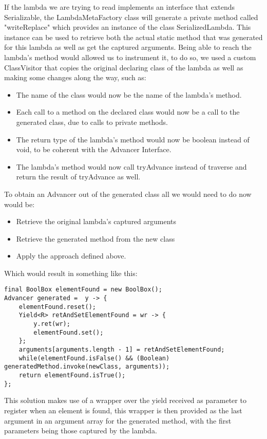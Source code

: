 If the lambda we are trying to read implements an interface that extends Serializable, the LambdaMetaFactory class will generate a private method called 
"writeReplace" which provides an instance of the class SerializedLambda. This instance can be used to retrieve both the actual static method that was generated for this lambda as well as get the captured arguments. Being able to reach the lambda's method would allowed us to instrument it, to do so, we used a custom ClassVisitor that copies the original declaring class of the lambda as well as making some changes along the way, such as:
\begin{itemize}
\item The name of the class would now be the name of the lambda's method.
\item Each call to a method on the declared class would now be a call to the generated class, due to calls to private methods.
\item The return type of the lambda's method would now be boolean instead of void, to be coherent with the Advancer Interface.
\item The lambda's method would now call tryAdvance instead of traverse and return the result of tryAdvance as well.
\end{itemize}

To obtain an Advancer out of the generated class all we would need to do now would be:
\begin{itemize}
\item Retrieve the original lambda's captured arguments
\item Retrieve the generated method from the new class
\item Apply the approach defined above.
\end{itemize}

Which would result in something like this:
\begin{lstlisting}[caption={Generated Advancer},captionpos=b]
final BoolBox elementFound = new BoolBox();
Advancer generated =  y -> {
	elementFound.reset();
	Yield<R> retAndSetElementFound = wr -> {
		y.ret(wr);
		elementFound.set();
	};
	arguments[arguments.length - 1] = retAndSetElementFound;
	while(elementFound.isFalse() && (Boolean) generatedMethod.invoke(newClass, arguments));
	return elementFound.isTrue();
};
\end{lstlisting}

This solution makes use of a wrapper over the yield received as parameter to register when an element is found, this wrapper is then provided as the last argument in an argument array for the generated method, with the first parameters being those captured by the lambda. 


